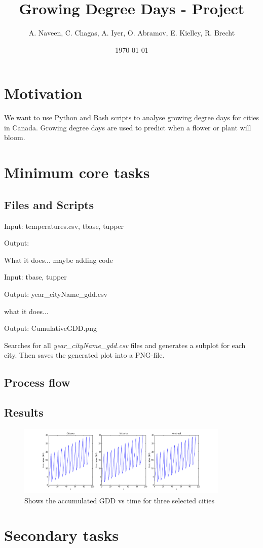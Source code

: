 \documentclass[12pt]{article}
\title{Growing Degree Days - Project}
\author{A. Naveen, C. Chagas, A. Iyer, O. Abramov, E. Kielley, R. Brecht}
\date{\today}
\begin{document}
\maketitle
\vspace{50pt}
\tableofcontents

\pagebreak
\section{Motivation}
We want to use Python and Bash scripts to analyse growing degree days for cities
in Canada. Growing degree days are used to predict when a flower or plant will 
bloom. 
\section{Minimum core tasks}

\subsection{Files and Scripts}
\begin{description}
\item[gdd.sh]
\item Input: temperatures.csv, tbase, tupper
\item Output:
\item What it does... maybe adding code

\item[gdd.py]
\item Input: tbase, tupper
\item Output: year\_cityName\_gdd.csv
\item what it does...

\item[temperature\_plot.py]

\item[plot\_cumulative\_GDD.py]
\item Output: CumulativeGDD.png
\item Searches for all \emph{year\_cityName\_gdd.csv} files and generates a subplot for
each city. Then saves the generated plot into a PNG-file.
\end{description}
\subsection{Process flow}

\subsection{Results}
	\begin{figure}[!htbp]
		\centering
		\includegraphics[width=0.9\textwidth]{../Plots/CumulativeGDD.png} 
		\caption{\scriptsize Shows the accumulated GDD vs time for three selected cities}\label{GDDplot}		  
	\end{figure}

\pagebreak
\section{Secondary tasks}
\end{document}
